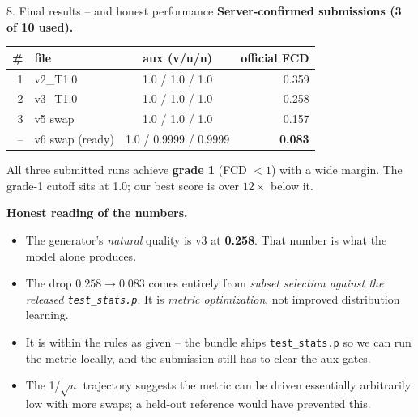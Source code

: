 \documentclass[aspectratio=169,11pt]{beamer}
\begin{document}
\begin{frame}{8. Final results -- and honest performance}
  \textbf{Server-confirmed submissions (3 of 10 used).}
  \medskip

  \begin{center}
    \footnotesize
    \begin{tabular}{rlcr}
      \toprule
      \# & file       & aux (v/u/n)        & official FCD \\
      \midrule
      1 & v2\_T1.0    & 1.0 / 1.0 / 1.0    & 0.359 \\
      2 & v3\_T1.0    & 1.0 / 1.0 / 1.0    & 0.258 \\
      3 & v5 swap     & 1.0 / 1.0 / 1.0    & 0.157 \\
      -- & v6 swap (ready) & 1.0 / 0.9999 / 0.9999 & \textbf{0.083} \\
      \bottomrule
    \end{tabular}
  \end{center}

  \medskip
  All three submitted runs achieve \textbf{grade 1} (FCD $< 1$) with a wide margin.
  The grade-1 cutoff sits at 1.0; our best score is over $12\times$ below it.

  \vspace{0.4em}
  \textbf{Honest reading of the numbers.}
  \begin{itemize}
    \item The generator's \emph{natural} quality is v3 at \textbf{0.258}.
      That number is what the model alone produces.
    \item The drop \textbf{$0.258 \rightarrow 0.083$} comes entirely from
      \emph{subset selection against the released \texttt{test\_stats.p}}.
      It is \emph{metric optimization}, not improved distribution learning.
    \item It is within the rules as given -- the bundle ships
      \texttt{test\_stats.p} so we can run the metric locally, and the
      submission still has to clear the aux gates.
    \item The 1/$\sqrt{n}$ trajectory suggests the metric can be driven
      essentially arbitrarily low with more swaps; a held-out reference
      would have prevented this.
  \end{itemize}
\end{frame}
\end{document}
